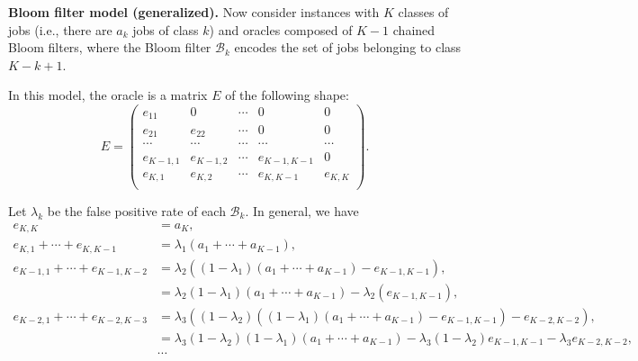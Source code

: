 \documentclass{article}
\begin{document}
\noindent\textbf{Bloom filter model (generalized).}
Now consider instances with \(K\) classes of jobs (i.e., there are \(a_k\) jobs of class \(k\)) and oracles composed of \(K-1\) chained Bloom filters, where the Bloom filter \(\mathcal{B}_k\) encodes the set of jobs belonging to class \(K-k+1\).

In this model, the oracle is a matrix \(E\) of the following shape:
\[
    E=\begin{pmatrix}
        e_{11} & 0      & \cdots & 0 & 0 \\
        e_{21} & e_{22} & \cdots & 0 & 0 \\
        \cdots & \cdots & \cdots & \cdots & \cdots \\
        e_{K-1,1} & e_{K-1,2} & \cdots & e_{K-1,K-1} & 0 \\
        e_{K,1}   & e_{K,2}   & \cdots & e_{K,K-1}   & e_{K,K} \\
    \end{pmatrix}.
\]

Let \(\lambda_k\) be the false positive rate of each \(\mathcal{B}_k\).
In general, we have
\begin{align*}
    e_{K,K}&=a_K, \\
    e_{K,1}+\cdots+e_{K,K-1}&=\lambda_1(a_1+\cdots+a_{K-1}), \\
    e_{K-1,1}+\cdots+e_{K-1,K-2}&=\lambda_2((1-\lambda_1)(a_1+\cdots+a_{K-1})-e_{K-1,K-1}), \\
    &=\lambda_2(1-\lambda_1)(a_1+\cdots+a_{K-1})-\lambda_2(e_{K-1,K-1}), \\
    e_{K-2,1}+\cdots+e_{K-2,K-3}&=\lambda_3((1-\lambda_2)((1-\lambda_1)(a_1+\cdots+a_{K-1})-e_{K-1,K-1})-e_{K-2,K-2}), \\
    &=\lambda_3(1-\lambda_2)(1-\lambda_1)(a_1+\cdots+a_{K-1})-\lambda_3(1-\lambda_2)e_{K-1,K-1}-\lambda_3e_{K-2,K-2}, \\
    &\cdots \\
\end{align*}
\end{document}
